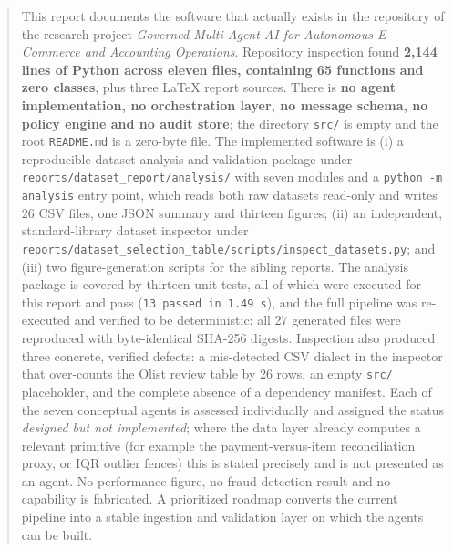 \documentclass[11pt,a4paper]{article}
\newcommand{\code}[1]{\texttt{#1}}
\begin{document}
\begin{abstract}
\noindent
This report documents the software that actually exists in the repository of the research project \emph{Governed Multi-Agent AI for Autonomous E-Commerce and Accounting Operations}. Repository inspection found \textbf{2{,}144 lines of Python across eleven files, containing 65 functions and zero classes}, plus three LaTeX report sources. There is \textbf{no agent implementation, no orchestration layer, no message schema, no policy engine and no audit store}; the directory \code{src/} is empty and the root \code{README.md} is a zero-byte file. The implemented software is (i) a reproducible dataset-analysis and validation package under \code{reports/dataset\_report/analysis/} with seven modules and a \code{python -m analysis} entry point, which reads both raw datasets read-only and writes 26 CSV files, one JSON summary and thirteen figures; (ii) an independent, standard-library dataset inspector under \code{reports/dataset\_selection\_table/scripts/inspect\_datasets.py}; and (iii) two figure-generation scripts for the sibling reports. The analysis package is covered by thirteen unit tests, all of which were executed for this report and pass (\code{13 passed in 1.49\,s}), and the full pipeline was re-executed and verified to be deterministic: all 27 generated files were reproduced with byte-identical SHA-256 digests. Inspection also produced three concrete, verified defects: a mis-detected CSV dialect in the inspector that over-counts the Olist review table by 26 rows, an empty \code{src/} placeholder, and the complete absence of a dependency manifest. Each of the seven conceptual agents is assessed individually and assigned the status \emph{designed but not implemented}; where the data layer already computes a relevant primitive (for example the payment-versus-item reconciliation proxy, or IQR outlier fences) this is stated precisely and is not presented as an agent. No performance figure, no fraud-detection result and no capability is fabricated. A prioritized roadmap converts the current pipeline into a stable ingestion and validation layer on which the agents can be built.
\end{abstract}

\tableofcontents
\clearpage

\end{document}
